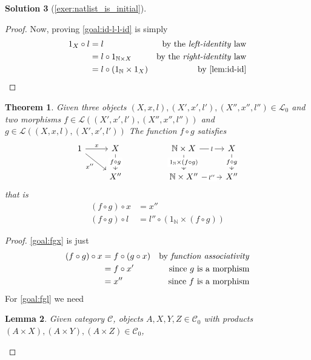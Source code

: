 \documentclass[a4paper,11pt, oneside,titlepage=false]{scrbook}
\theoremstyle{plain}
\newtheorem{thm}{Theorem}
\newtheorem{lemma}[thm]{Lemma}
\theoremstyle{definition}
\newtheorem{solution}[thm]{Solution}
\newcommand{\Cat}[1]{\mathcal{#1}}
\newcommand{\CC}{\Cat{C}}
\newcommand{\NN}{\ensuremath{\mathbb{N}}}
\begin{document}
\begin{solution}[\cref{exer:natlist_is_initial}]
\begin{proof}
			Now, proving \eqref{goal:id-l-l-id} is simply
			\begin{align*}
				1_X \circ l & = l                        & \text{by the \textit{left-identity} law}  \\
				            & = l \circ 1_{\NN \times X}   & \text{by the \textit{right-identity} law} \\
				            & = l \circ (1_\NN \times 1_X) & \text{by \cref{lem:id-id}}
			\end{align*}
		\end{proof}
		\begin{thm}
			Given three objects $(X,x,l), (X',x',l'), (X'', x'', l'') \in \Cat{L}_0$ and two morphisms $f \in \Cat{L}((X', x', l'), (X'', x'', l''))$ and $g \in \Cat{L}((X, x, l), (X', x', l'))$
			The function $f \circ g$ satisfies
			\[
				\begin{tikzcd}
          1 & X && {\NN \times X} & X \\
            & X'' && {\NN \times X''} & X''
					\arrow["x", from=1-1, to=1-2]
					\arrow["x''"', from=1-1, to=2-2]
					\arrow["{f \circ g}"{description}, from=1-2, to=2-2]
					\arrow["l"{description}, from=1-4, to=1-5]
					\arrow["l''"{description}, from=2-4, to=2-5]
					\arrow["{f \circ g}"{description}, from=1-5, to=2-5]
					\arrow["{1_\NN \times (f \circ g)}"{description}, from=1-4, to=2-4]
				\end{tikzcd}
			\]
			that is
			\begin{align}
				(f \circ g) \circ x & = x'' \label{goal:fgx}                                         \\
				(f \circ g) \circ l & = l'' \circ (1_\NN \times (f \circ g)) \label{goal:fgl}
			\end{align}
		\end{thm}
		\begin{proof}
			\eqref{goal:fgx} is just
			\begin{align*}
				(f \circ g) \circ x & = f \circ (g \circ x) & \text{by \textit{function associativity}} \\
				                    & = f \circ x'          & \text{since $g$ is a morphism}            \\
				                    & = x''                 & \text{since $f$ is a morphism}
			\end{align*}
			For \eqref{goal:fgl} we need
			\begin{lemma}
				\label{lem:id-fg}
				Given category $\CC$,
				objects $A,X,Y,Z \in \CC_0$
				with products $(A \times X), (A \times Y), (A \times Z) \in \CC_0$,

\end{lemma}
\end{proof}
\end{solution}
\end{document}
